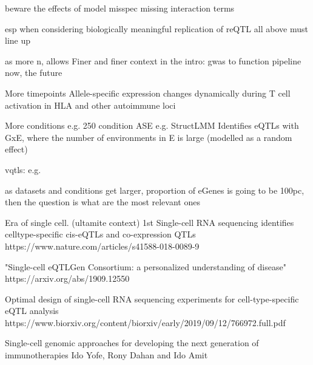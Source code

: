 \begin{outline}
        beware the effects of model misspec
            missing interaction terms

        esp when considering biologically meaningful replication of reQTL
            all above must line up

as more n, allows
Finer and finer context
    in the intro: gwas to function pipeline
    now, the future

    More timepoints
    Allele-specific expression changes dynamically during T cell activation in HLA and other autoimmune loci

    More conditions
    e.g. 250 condition ASE %
    e.g. StructLMM 
        Identifies eQTLs with GxE, where the number of environments in E is large (modelled as a random effect)

        vqtls: e.g. %

    as datasets and conditions get larger, proportion of eGenes is going to be 100pc, then the question is what are the most relevant ones

    Era of single cell. (ultamite context)
        1st
        Single-cell RNA sequencing identifies celltype-specific cis-eQTLs and co-expression QTLs
        https://www.nature.com/articles/s41588-018-0089-9

        "Single-cell eQTLGen Consortium: a personalized understanding of disease"
        https://arxiv.org/abs/1909.12550

        Optimal design of single-cell RNA sequencing experiments for cell-type-specific eQTL analysis
        https://www.biorxiv.org/content/biorxiv/early/2019/09/12/766972.full.pdf

        Single-cell genomic approaches for developing the next generation of immunotherapies Ido Yofe, Rony Dahan and Ido Amit



\end{outline}
